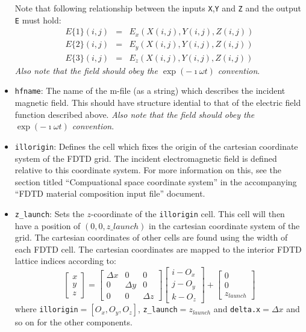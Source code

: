 \documentclass[a4paper, 12pt]{article}
\begin{document}
\begin{itemize}
\begin{itemize}
		\end{itemize}
		Note that following relationship between the inputs
		\verb+X+,\verb+Y+ and \verb+Z+ and the output \verb+E+ must hold:
		\begin{eqnarray}
			E\{1\}(i,j)& =& E_x(X(i,j),Y(i,j),Z(i,j))  \nonumber \\
			E\{2\}(i,j)& =& E_y(X(i,j),Y(i,j),Z(i,j)) \nonumber \\
			E\{3\}(i,j)& =& E_z(X(i,j),Y(i,j),Z(i,j)) \nonumber
		\end{eqnarray}
		\emph{Also note that the field should obey the $\exp(-\imath \omega t)$ convention}.
		\item \verb+hfname+: The name of the m-file (as a string) which describes the
		incident magnetic field. This should have structure idential to that
		of the electric field function described above. \emph{Also note that
			the field should obey the $\exp(-\imath \omega t)$ convention}.
		\item \verb+illorigin+: Defines the cell which fixes the origin
		of the cartesian coordinate system of the FDTD grid. The incident
		electromagnetic field is defined relative to this coordinate
		system. For more information on this, see the section titled
		``Compuational space coordinate system'' in the accompanying ``FDTD
		material composition input file'' document.
		\item \verb+z_launch+: Sets the $z$-coordinate of the \verb+illorigin+
		cell. This cell will then have a position of $(0,0,z\_launch)$ in the
		cartesian coordinate system of the grid. The cartesian coordinates
		of other cells are found using the width of each FDTD cell. The
		cartesian coordinates are mapped to the interior FDTD lattice
		indices according to:
		\begin{equation}
			\left[\begin{array}{c} x\\ y\\ z\end{array}\right] = \left[\begin{array}{ccc}\Delta x & 0 & 0\\ 0 & \Delta y &
				0\\ 0 & 0 & \Delta z
			\end{array}\right]\left[\begin{array}{c}i-O_x\\j-O_y\\k-O_z\end{array}\right]+\left[\begin{array}{c} 0\\ 0\\ z_{launch}\end{array}\right]\label{eq:mapping}
		\end{equation}
		where \verb+illorigin+$=[O_x,O_y,O_z]$, \verb+z_launch+$=z_{launch}$
		and \verb+delta.x+$=\Delta x$ and so on for the other components.


\end{itemize}
\end{document}
